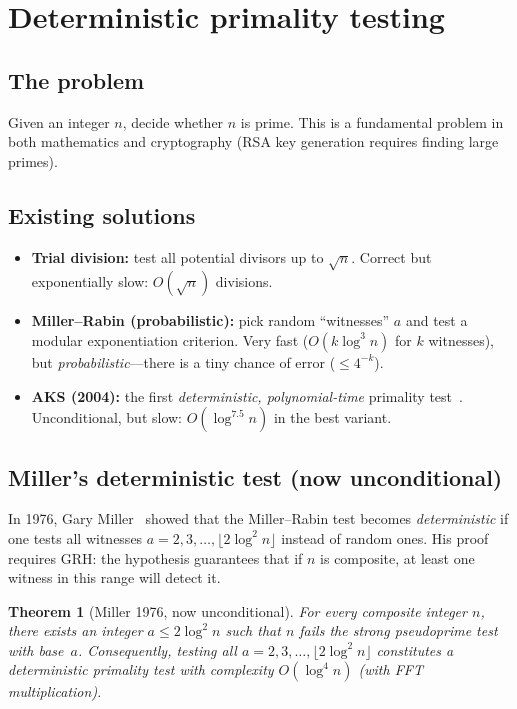 \documentclass[11pt]{article}
\theoremstyle{plain}
\newtheorem{theorem}{Theorem}
\theoremstyle{definition}
\theoremstyle{remark}
\begin{document}
\section{Deterministic primality testing}\label{sec:miller}

\subsection{The problem}

Given an integer $n$, decide whether $n$ is prime. This is a fundamental
problem in both mathematics and cryptography (RSA key generation requires
finding large primes).

\subsection{Existing solutions}

\begin{itemize}
\item \textbf{Trial division:} test all potential divisors up to $\sqrt{n}$.
Correct but exponentially slow: $O(\sqrt{n})$ divisions.
\item \textbf{Miller--Rabin (probabilistic):} pick random ``witnesses''
$a$ and test a modular exponentiation criterion. Very fast ($O(k \log^3 n)$
for $k$ witnesses), but \emph{probabilistic}---there is a tiny chance
of error ($\leq 4^{-k}$).
\item \textbf{AKS (2004):} the first \emph{deterministic, polynomial-time}
primality test~\cite{AKS2004}. Unconditional, but slow:
$O(\log^{7.5} n)$ in the best variant.
\end{itemize}

\subsection{Miller's deterministic test (now unconditional)}

In 1976, Gary Miller~\cite{Miller1976} showed that the Miller--Rabin
test becomes \emph{deterministic} if one tests all witnesses
$a = 2, 3, \ldots, \lfloor 2\log^2 n \rfloor$ instead of random ones.
His proof requires GRH: the hypothesis guarantees that if $n$ is
composite, at least one witness in this range will detect it.

\begin{theorem}[Miller 1976, now unconditional]\label{thm:miller}
For every composite integer $n$, there exists an integer
$a \leq 2\log^2 n$ such that $n$ fails the strong pseudoprime test
with base~$a$. Consequently, testing all $a = 2, 3, \ldots,
\lfloor 2\log^2 n \rfloor$ constitutes a deterministic primality test
with complexity $O(\log^4 n)$ (with FFT multiplication).
\end{theorem}
\end{document}
